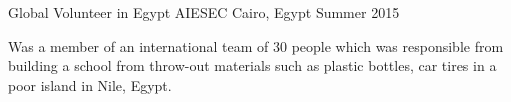 \begin{cventries}
{\begin{cvitems}
     \end{cvitems}
    }
  \cvopenentry
    {Global Volunteer in Egypt } %
    {AIESEC} %
    {Cairo, Egypt} %
    {Summer 2015} %
    {
      \begin{cvitems} %
        \item {Was a member of an international team of 30 people which was responsible from building a school from throw-out materials such as plastic bottles, car tires in a poor island in Nile, Egypt. }
      \end{cvitems}
    }


\begin{comment}
Commented code
  \cventry
    {Reviewer and Participant} %
    {Algorithm Competition Programme} %
    {Inzva, Istanbul} %
    {Oct. 2018 - May. 2019} %
    {
      \begin{cvitems} %
        \item {Participated in the 30-week Algorithm Competition Programme which includes lectures, contests, and a variety of practises.}
      \end{cvitems}
    }
    \vspace{2mm}
\cventry
    {Member} %
    {Association for Computing Machinery Society} %
    {Koc Universtiy} %
    {Oct. 2017 - Present} %
    {
      \begin{cvitems} %
        \item {Responsible for organizing IoT and robotics related workshops, conferences for new members. }
        \item {Developing tech-projects to attend national and international competitions. }
      \end{cvitems}
    }

  \cventry
    {Global Volunteer in Egypt } %
    {AIESEC} %
    {Cairo, Egypt} %
    {Summer 2015} %
    {
      \begin{cvitems} %
        \item {Was a member of an international team of 30 people which was responsible from building a school from throw-out materials such as plastic bottles, car tires in a poor island in Nile, Egypt. }
      \end{cvitems}
    }


\end{comment}
\end{cventries}
